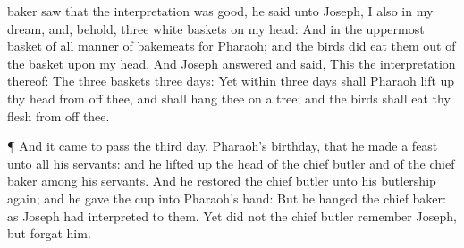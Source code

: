{baker
saw that the
interpretation was
good, he
said unto
Joseph, I
also
{} in my
dream, and, behold,
{}
three
white
baskets on my
head:
And in the
uppermost
basket
{} of all
manner of
bakemeats for
Pharaoh; and the
birds did
eat them out of the
basket
upon my
head.
And
Joseph
answered and
said, This
{} the
interpretation thereof: The
three
baskets
{}
three
days:
Yet within
three
days shall
Pharaoh lift
up thy
head from off thee, and shall
hang thee on a
tree; and the
birds shall
eat thy
flesh from off thee.
\par }{\PP {}¶ And it came to pass the
third
day,
{}
Pharaoh’s
birthday, that he
made a
feast unto all his
servants: and he lifted
up the
head of the
chief
butler and of the
chief
baker
among his
servants.
And he
restored the
chief
butler unto his
butlership
again; and he
gave the
cup into
Pharaoh’s
hand:
But he
hanged the
chief
baker: as
Joseph had
interpreted to them.
Yet did not the
chief
butler
remember
Joseph, but
forgat him.

}
